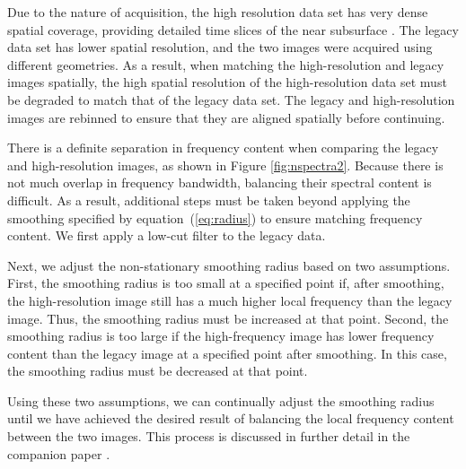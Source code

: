 Due to the nature of acquisition, the high resolution data set has very dense spatial coverage, %
providing detailed time slices of the near subsurface \cite[]{tip}. The legacy data set has lower spatial resolution, and the two images were acquired using different geometries. %
As a result, when matching the high-resolution and legacy images spatially, the high spatial resolution of the high-resolution data set must be degraded to match that of the legacy data set. The legacy and high-resolution images are rebinned to ensure that they are aligned spatially before continuing.



There is a definite separation in frequency content when comparing the legacy and high-resolution images, as shown in Figure \ref{fig:nspectra2}. 
Because there is not much overlap in frequency bandwidth, balancing their spectral content is difficult. As a result, additional steps must be taken beyond applying the smoothing specified by equation~(\ref{eq:radius}) to ensure matching frequency content. We first apply a low-cut filter to the legacy data. 

Next, we adjust the non-stationary smoothing radius based on two assumptions. 
First, the smoothing radius is too small at a specified point if, after smoothing, the high-resolution image still has a much higher local frequency than the legacy image. Thus, the smoothing radius must be increased at that point.
Second, the smoothing radius is too large if the high-frequency image has lower frequency content than the legacy image at a specified point after smoothing. In this case, the smoothing radius must be decreased at that point.

Using these two assumptions, we can continually adjust the smoothing radius until we have achieved the desired result of balancing the local frequency content between the two images. This process is discussed in further detail in the companion paper \cite[]{locfreq}.

